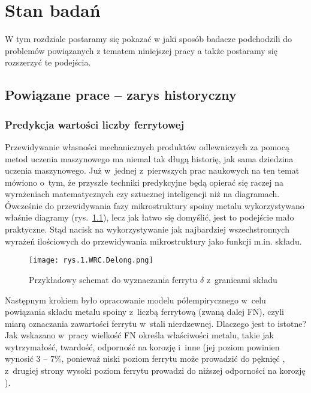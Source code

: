 
\chapter{Stan badań}
\label{cha:stan.badan}

W tym rozdziale postaramy się pokazać w jaki sposób badacze podchodzili do problemów powiązanych z tematem niniejszej pracy a także postaramy się rozszerzyć te podejścia.

\section{Powiązane prace – zarys historyczny}
\label{sec:zarys.historyczny}

\subsection{Predykcja wartości liczby ferrytowej}
\label{sec:liczba.ferrytowa}

Przewidywanie własności mechanicznych produktów odlewniczych za pomocą metod uczenia maszynowego ma niemal tak długą historię, jak sama dziedzina uczenia maszynowego. Już w~jednej z~pierwszych prac naukowych na ten temat \cite{Olson85} mówiono o~tym, że przyszłe techniki predykcyjne będą opierać się raczej na wyrażeniach matematycznych czy sztucznej inteligencji niż na diagramach. 
Ówcześnie do przewidywania fazy mikrostruktury spoiny metalu wykorzystywano właśnie diagramy (rys.~\ref{fig:mesh1}), lecz jak łatwo się domyślić, jest to podejście mało praktyczne. Stąd nacisk na wykorzystywanie jak najbardziej wszechstronnych wyrażeń ilościowych do przewidywania mikrostruktury jako funkcji m.in. składu.

\begin{figure}[h]
    \centering
    \texttt{[image: rys.1.WRC.Delong.png]}
    \caption{Przykładowy schemat do wyznaczania ferrytu $ \delta $ z~granicami składu \cite{DeLong73}}
    \label{fig:mesh1}
\end{figure}

Następnym krokiem było opracowanie modelu półempirycznego w~celu powiązania składu metalu spoiny z~liczbą ferrytową (zwaną dalej FN), czyli miarą oznaczania zawartości ferrytu w~stali nierdzewnej. Dlaczego jest to istotne? Jak wskazano w~pracy \cite{Vitek03.I} wielkość FN określa właściwości metalu, takie jak wytrzymałość, twardość, odporność na korozję i~inne (jej poziom powinien wynosić $3$ – $7\%$, ponieważ niski poziom ferrytu może prowadzić do pęknięć \cite{ferrite.meter, Saluja15}, z~drugiej strony wysoki poziom ferrytu prowadzi do niższej odporności na korozję \cite{Saluja15}). 

